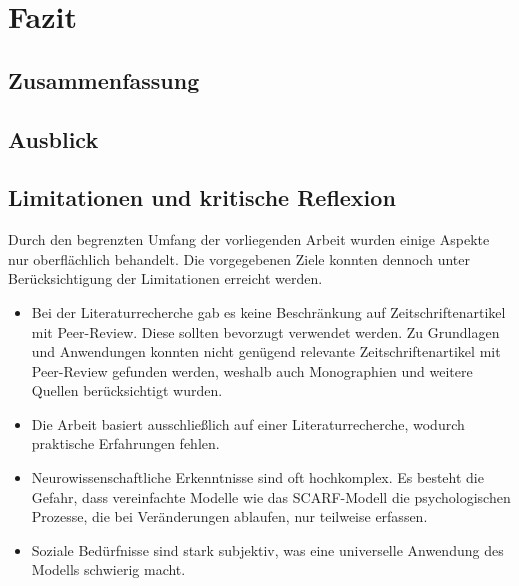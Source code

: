 \section{Fazit}

\subsection{Zusammenfassung}


\subsection{Ausblick}


\subsection{Limitationen und kritische Reflexion}
Durch den begrenzten Umfang der vorliegenden Arbeit wurden einige Aspekte nur oberflächlich behandelt. 
Die vorgegebenen Ziele konnten dennoch unter Berücksichtigung der Limitationen erreicht werden.
\begin{itemize}
    \item Bei der Literaturrecherche gab es keine Beschränkung auf Zeitschriftenartikel mit Peer-Review. Diese sollten bevorzugt verwendet werden. Zu Grundlagen und Anwendungen konnten nicht genügend relevante Zeitschriftenartikel mit Peer-Review gefunden werden, weshalb auch Monographien und weitere Quellen berücksichtigt wurden.
    \item Die Arbeit basiert ausschließlich auf einer Literaturrecherche, wodurch praktische Erfahrungen fehlen.
    \item Neurowissenschaftliche Erkenntnisse sind oft hochkomplex. Es besteht die Gefahr, dass vereinfachte Modelle wie das SCARF-Modell die psychologischen Prozesse, die bei Veränderungen ablaufen, nur teilweise erfassen.
    \item Soziale Bedürfnisse sind stark subjektiv, was eine universelle Anwendung des Modells schwierig macht.
\end{itemize}
